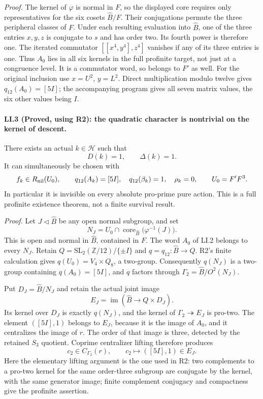 \emph{Proof.}
The kernel of $\varphi$ is normal in $F$, so the displayed core
requires only representatives for the six cosets $\widehat B/F$.
Their conjugations permute the three peripheral classes of $F$.
Under each resulting evaluation into $\widehat B$, one of the
three entries $x,y,z$ is conjugate to $s$ and has order two.
Its fourth power is therefore one. The iterated commutator
$[[x^4,y^4],z^4]$ vanishes if any of its three entries is one.
Thus $A_0$ lies in all six kernels in the full profinite target,
not just at a congruence level. It is a commutator word, so belongs
to $F'$ as well. For the original inclusion use
$x=U^2$, $y=L^2$. Direct multiplication modulo twelve gives
$q_{12}(A_0)=[5I]$; the accompanying program gives all seven
matrix values, the six other values being $I$.

\paragraph{LI.3 (Proved, using R2): the quadratic character is nontrivial on the kernel of descent.}
There exists an actual $k\in\mathcal H$ such that
\[
 \boxed{\ D(k)=1,\qquad\Delta(k)=1.\ }
\]
It can simultaneously be chosen with
\[
 f_k\in R_{\rm nil}(U_0),\qquad
 q_{12}(A_k)=[5I],\quad q_{12}(\beta_k)=1,\quad \rho_k=0,
 \qquad U_0=F'F^3.
\]
In particular it is invisible on every absolute pro-prime pure action.
This is a full profinite existence theorem, not a finite survival result.

\emph{Proof.}
Let $J\triangleleft\widehat B$ be any open normal subgroup, and set
\[
 N_J=U_0\cap\operatorname{core}_{\widehat B}
                              \bigl(\varphi^{-1}(J)\bigr).
\]
This is open and normal in $\widehat B$, contained in $F$.
The word $A_0$ of LI.2 belongs to every $N_J$.
Retain $Q=\mathrm{SL}_2(\mathbb Z/12)/\{\pm I\}$ and
$q=q_{12}:\widehat B\to Q$. R2's finite calculation gives
$q(U_0)=V_4\times Q_8$, a two-group. Consequently $q(N_J)$
is a two-group containing $q(A_0)=[5I]$, and $q$ factors through
$\Gamma_2=\widehat B/O^2(N_J)$.

Put $D_J=\widehat B/N_J$ and retain the actual joint image
\[
 E_J=\operatorname{im}(\widehat B\to Q\times D_J).
\]
Its kernel over $D_J$ is exactly $q(N_J)$, and the kernel of
$\Gamma_2\twoheadrightarrow E_J$ is pro-two. The element
$([5I],1)$ belongs to $E_J$, because it is the image of $A_0$,
and it centralizes the image of $r$. The order of that image is
three, detected by the retained $S_3$ quotient. Coprime
centralizer lifting therefore produces
\[
 c_2\in C_{\Gamma_2}(r),\qquad
 c_2\longmapsto([5I],1)\in E_J.
\]
Here the elementary lifting argument is the one used in R2:
two complements to a pro-two kernel for the same order-three
subgroup are conjugate by the kernel, with the same generator
image; finite complement conjugacy and compactness give the
profinite assertion.

